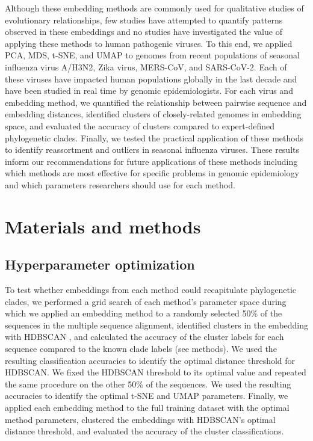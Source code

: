 \documentclass[10pt,letterpaper]{article}
\begin{document}
Although these embedding methods are commonly used for qualitative studies of evolutionary relationships, few studies have attempted to quantify patterns observed in these embeddings and no studies have investigated the value of applying these methods to human pathogenic viruses.
To this end, we applied PCA, MDS, t-SNE, and UMAP to genomes from recent populations of seasonal influenza virus A/H3N2, Zika virus, MERS-CoV, and SARS-CoV-2.
Each of these viruses have impacted human populations globally in the last decade and have been studied in real time by genomic epidemiologists.
For each virus and embedding method, we quantified the relationship between pairwise sequence and embedding distances, identified clusters of closely-related genomes in embedding space, and evaluated the accuracy of clusters compared to expert-defined phylogenetic clades.
Finally, we tested the practical application of these methods to identify reassortment and outliers in seasonal influenza viruses.
These results inform our recommendations for future applications of these methods including which methods are most effective for specific problems in genomic epidemiology and which parameters researchers should use for each method.

\section*{Materials and methods}

\subsection*{Hyperparameter optimization}

To test whether embeddings from each method could recapitulate phylogenetic clades, we performed a grid search of each method's parameter space during which we applied an embedding method to a randomly selected 50\% of the sequences in the multiple sequence alignment, identified clusters in the embedding with HDBSCAN \cite{hdbscan}, and calculated the accuracy of the cluster labels for each sequence compared to the known clade labels (see methods).
We used the resulting classification accuracies to identify the optimal distance threshold for HDBSCAN.
We fixed the HDBSCAN threshold to its optimal value and repeated the same procedure on the other 50\% of the sequences.
We used the resulting accuracies to identify the optimal t-SNE and UMAP parameters.
Finally, we applied each embedding method to the full training dataset with the optimal method parameters, clustered the embeddings with HDBSCAN's optimal distance threshold, and evaluated the accuracy of the cluster classifications.
\end{document}
